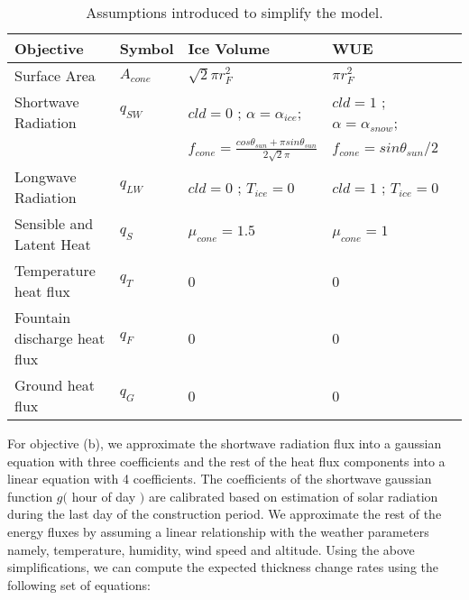 \documentclass[tc, manuscript]{copernicus}
\begin{document}
\begin{table}[]
\centering
\caption{Assumptions introduced to simplify the model.}
\label{tab:my-table}
\begin{tabular}{@{}lllll@{}}
\toprule
\textbf{Objective} & \textbf{Symbol} & \textbf{Ice Volume} & \textbf{WUE} & \\ \midrule
\multicolumn{1}{|l}{Surface Area}        & $A_{cone}$ & $ \sqrt{2} \pi r_{F}^2$ & $\pi r_{F}^2$ & \multicolumn{1}{l|}{} \\ \midrule
\multicolumn{1}{|l}{Shortwave Radiation} & $q_{SW}$ & $cld = 0$ ; $\alpha=\alpha_{ice}$; & $cld = 1$ ;
$\alpha=\alpha_{snow}$; & \multicolumn{1}{l|}{} \\ 
\multicolumn{1}{|l}{ } &  & $f_{cone} = \frac{cos \theta_{sun} + \pi sin \theta_{sun}}{2\sqrt{2}\pi}$  & $f_{cone} = sin \theta_{sun} / 2$ & \multicolumn{1}{l|}{} \\ \midrule
\multicolumn{1}{|l}{Longwave Radiation}  & $q_{LW}$ & $cld = 0$ ; $T_{ice} = 0$ & $cld = 1$ ; $T_{ice} = 0$ & \multicolumn{1}{l|}{} \\ \midrule
\multicolumn{1}{|l}{Sensible and Latent Heat}       & $q_{S}$ &$\mu_{cone} = 1.5$  & $\mu_{cone} = 1$ & \multicolumn{1}{l|}{} \\ \midrule
\multicolumn{1}{|l}{Temperature heat flux} & $q_{T}$ & 0 & 0 & \multicolumn{1}{l|}{} \\ \midrule
\multicolumn{1}{|l}{Fountain discharge heat flux} & $q_{F}$ & 0 & 0 & \multicolumn{1}{l|}{} \\ \midrule
\multicolumn{1}{|l}{Ground heat flux}    & $q_{G}$ & 0 & 0 & \multicolumn{1}{l|}{} \\ \bottomrule
\end{tabular}
\end{table}

For objective (b), we approximate the shortwave radiation flux into a gaussian equation with three coefficients
and the rest of the heat flux components into a linear equation with 4 coefficients. The coefficients of the
shortwave gaussian function $g($ hour of day $)$ are calibrated based on estimation of solar radiation during
the last day of the construction period. We approximate the rest of the energy fluxes by assuming a linear
relationship with the weather parameters namely, temperature, humidity, wind speed and altitude. Using the above
simplifications, we can compute the expected thickness change rates using the following set of equations:
\end{document}
